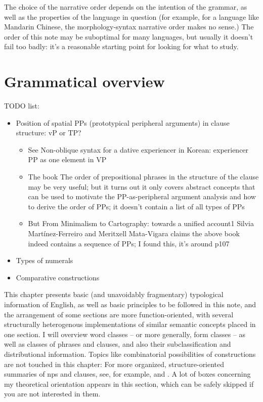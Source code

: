 \documentclass[UTF8, a4paper, oneside, scheme=plain]{ctexrep}
\begin{document}
The choice of the narrative order depends on the intention of the grammar,
as well as the properties of the language in question 
(for example, for a language like Mandarin Chinese, 
the morphology-syntax narrative order makes no sense.)
The order of this note may be suboptimal for many languages,
but usually it doesn't fail too badly:
it's a reasonable starting point for looking for what to study.

\chapter{Grammatical overview}\label{chap:overview}

TODO list:
\begin{itemize}
    \item Position of spatial PPs (prototypical peripheral arguments) in clause structure: vP or TP?
    \begin{itemize}
        \item See Non-oblique syntax for a dative experiencer in Korean: experiencer PP as one element in VP
        \item The book The order of prepositional phrases in the structure of the clause may be very useful;
        but it turns out it only covers abstract concepts that can be used to motivate the PP-as-peripheral argument analysis and how to derive the order of PPs; it doesn't contain a list of all types of PPs
        \item But From Minimalism to Cartography: towards a unified account1
        Silvia Martínez-Ferreiro and Meritxell Mata-Vigara claims the above book indeed contains 
        a sequence of PPs; I found this, it's around p107
    \end{itemize}
    \item Types of numerals 
    \item Comparative constructions
\end{itemize}

This chapter presents basic (and unavoidably fragmentary) typological information of English,
as well as basic principles to be followed in this note,
and the arrangement of some sections are more function-oriented, 
with several structurally heterogenous implementations of 
similar semantic concepts placed in one section.
I will overview word classes -- or more generally, form classes -- 
as well as classes of phrases and clauses,
and also their subclassification and distributional information.
Topics like combinatorial possibilities of constructions
are not touched in this chapter:
For more organized, structure-oriented summaries of 
\acs{np}s and clauses, 
see, for example,  and .
A lot of boxes concerning my theoretical orientation appears in this section,
which can be safely skipped if you are not interested in them.
\end{document}

